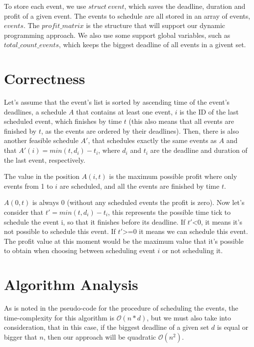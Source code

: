 \documentclass{article}
\begin{document}
\qquad To store each event, we use $struct\ event$, which saves the deadline, duration and profit of a given event. The events to schedule are all stored in an array of events, $events$. The $profit\_matrix$ is the structure that will support our dynamic programming approach. We also use some support global variables, such as $total\_count\_events$, which keeps the biggest deadline of all events in a givent set.

\section{Correctness}

\qquad Let's assume that the event's list is sorted by ascending time of the event's deadlines, a schedule $A$ that contains at least one event, $i$ is the ID of the last scheduled event, which finishes by time $t$ (this also means that all events are finished by $t$, as the events are ordered by their deadlines). Then, there is also another feasible schedule $A'$, that schedules exactly the same events as $A$ and that $A'(i) = min(t, d_i) - t_i$, where $d_i$ and $t_i$ are the deadline and duration of the last event, respectively.

The value in the position $A(i, t)$ is the maximum possible profit where only events from 1 to $i$ are scheduled, and all the events are finished by time $t$.

$A(0, t)$ is always 0 (without any scheduled events the profit is zero). Now let's consider that $t' = min(t, d_i) - t_i$, this represents the possible time tick to schedule the event i, so that it finishes before its deadline. If $t'$<0, it means it's not possible to schedule this event. If $t'$>=0 it means we can schedule this event. The profit value at this moment would be the maximum value that it's possible to obtain when choosing between scheduling event $i$ or not scheduling it.



\section{Algorithm Analysis}

\qquad As is noted in the pseudo-code for the procedure of scheduling the events, the time-complexity for this algorithm is $\mathcal{O}(n*d)$, but we must also take into consideration, that in this case, if the biggest deadline of a given set $d$ is equal or bigger that $n$, then our approach will be quadratic $\mathcal{O}(n^2)$.
\end{document}
